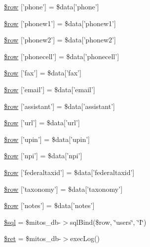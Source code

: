\begin{DoxyCompactItemize}
\item 
\hyperlink{miscellaneous_2addressbook_2data__create_8ejs_8php_a9eb773d64ffa16faf1e29ccbaf4f065c}{\$row} \mbox{[}'phone'\mbox{]} = \$data\mbox{[}'phone'\mbox{]}
\item 
\hyperlink{miscellaneous_2addressbook_2data__create_8ejs_8php_abd903592f46e704ef4bf1d9b96891334}{\$row} \mbox{[}'phonew1'\mbox{]} = \$data\mbox{[}'phonew1'\mbox{]}
\item 
\hyperlink{miscellaneous_2addressbook_2data__create_8ejs_8php_ac8ae8c92d60ba675fbaeda33916b1ecb}{\$row} \mbox{[}'phonew2'\mbox{]} = \$data\mbox{[}'phonew2'\mbox{]}
\item 
\hyperlink{miscellaneous_2addressbook_2data__create_8ejs_8php_a0517e1ea0f1ef22772f36b37a743d1be}{\$row} \mbox{[}'phonecell'\mbox{]} = \$data\mbox{[}'phonecell'\mbox{]}
\item 
\hyperlink{miscellaneous_2addressbook_2data__create_8ejs_8php_addcf6434ea14720a2fb19d21dc55a8c9}{\$row} \mbox{[}'fax'\mbox{]} = \$data\mbox{[}'fax'\mbox{]}
\item 
\hyperlink{miscellaneous_2addressbook_2data__create_8ejs_8php_a40ee16d8fb0e37c2da5cf0da20f73f1d}{\$row} \mbox{[}'email'\mbox{]} = \$data\mbox{[}'email'\mbox{]}
\item 
\hyperlink{miscellaneous_2addressbook_2data__create_8ejs_8php_ac70ddecf301c4fec9f747b5c7c861243}{\$row} \mbox{[}'assistant'\mbox{]} = \$data\mbox{[}'assistant'\mbox{]}
\item 
\hyperlink{miscellaneous_2addressbook_2data__create_8ejs_8php_adf1010d02c9d45b59dd4435673a49506}{\$row} \mbox{[}'url'\mbox{]} = \$data\mbox{[}'url'\mbox{]}
\item 
\hyperlink{miscellaneous_2addressbook_2data__create_8ejs_8php_aaa10113ab6f803b651bde517d2c22961}{\$row} \mbox{[}'upin'\mbox{]} = \$data\mbox{[}'upin'\mbox{]}
\item 
\hyperlink{miscellaneous_2addressbook_2data__create_8ejs_8php_ae8acb53d6d8e83580307a5aa95fd2304}{\$row} \mbox{[}'npi'\mbox{]} = \$data\mbox{[}'npi'\mbox{]}
\item 
\hyperlink{miscellaneous_2addressbook_2data__create_8ejs_8php_a276b7e7d1682582d07599773e5677ad1}{\$row} \mbox{[}'federaltaxid'\mbox{]} = \$data\mbox{[}'federaltaxid'\mbox{]}
\item 
\hyperlink{miscellaneous_2addressbook_2data__create_8ejs_8php_ac3ee7cf124d7401bbb138317989b316c}{\$row} \mbox{[}'taxonomy'\mbox{]} = \$data\mbox{[}'taxonomy'\mbox{]}
\item 
\hyperlink{miscellaneous_2addressbook_2data__create_8ejs_8php_a6cd140f95df717cfed217fe478482645}{\$row} \mbox{[}'notes'\mbox{]} = \$data\mbox{[}'notes'\mbox{]}
\item 
\hyperlink{miscellaneous_2addressbook_2data__create_8ejs_8php_a047170d6020a882807665812a27e2525}{\$sql} = \$mitos\-\_\-db-\/$>$sql\-Bind(\$row, \char`\"{}users\char`\"{}, \char`\"{}\-I\char`\"{})
\item 
\hyperlink{miscellaneous_2addressbook_2data__create_8ejs_8php_affd9e3eb0aad0a7ca42912cd925f148c}{\$ret} = \$mitos\-\_\-db-\/$>$exec\-Log()
\end{DoxyCompactItemize}


